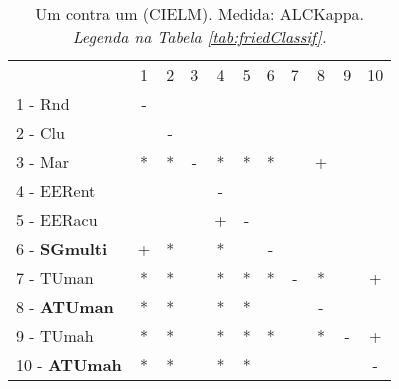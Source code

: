 \begin{table}[h]
\caption{Um contra um (CIELM). Medida: ALCKappa. \textit{Legenda na Tabela \ref{tab:friedClassif}.}}
\begin{center}\begin{tabular}{lcc|cc|cc|cc|cc}
 			& 1 & 2 & 3 & 4 & 5 & 6 & 7 & 8 & 9 & 10\\
1 - Rnd  	& - &   &   &   &   &   &   &   &   &   \\
2 - Clu  	&   & - &   &   &   &   &   &   &   &   \\ \hline
3 - Mar  	& * & * & - & * & * & * &   & + &   &   \\
4 - EERent	&   &   &   & - &   &   &   &   &   &   \\ \hline
5 - EERacu	&   &   &   & + & - &   &   &   &   &   \\
6 - \textbf{SGmulti}	& + & * &   & * &   & - &   &   &   &   \\ \hline
7 - TUman	& * & * &   & * & * & * & - & * &   & + \\
8 - \textbf{ATUman}	& * & * &   & * & * &   &   & - &   &   \\ \hline
9 - TUmah	& * & * &   & * & * & * &   & * & - & + \\
10 - \textbf{ATUmah}	& * & * &   & * & * &   &   &   &   & - \\ \hline\end{tabular}
\label{stratsALCKappaFriedCIELMRedux}
\end{center}
\end{table}